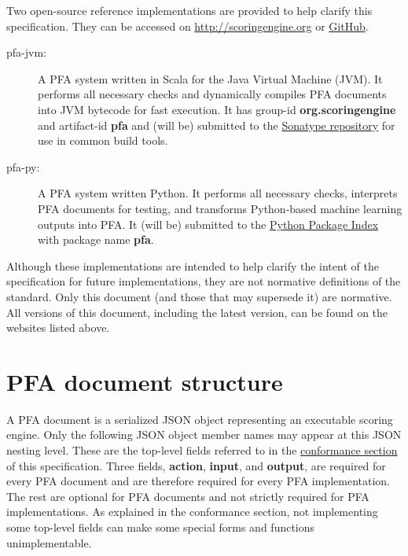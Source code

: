 \documentclass{article}
\newcommand{\PFAc}{\ttfamily\bfseries}
\theoremstyle{definition}
\begin{document}
Two open-source reference implementations are provided to help clarify this specification.  They can be accessed on \url{http://scoringengine.org} or \href{https://github.com/scoringengine/pfa}{GitHub}.
\begin{description}
\item[pfa-jvm:] A PFA system written in Scala for the Java Virtual Machine (JVM).  It performs all necessary checks and dynamically compiles PFA documents into JVM bytecode for fast execution.  It has group-id {\PFAc org.scoringengine} and artifact-id {\PFAc pfa} and (will be) submitted to the \href{http://search.maven.org/}{Sonatype repository} for use in common build tools.
\item[pfa-py:] A PFA system written Python.  It performs all necessary checks, interprets PFA documents for testing, and transforms Python-based machine learning outputs into PFA.  It (will be) submitted to the \href{https://pypi.python.org/pypi}{Python Package Index} with package name {\PFAc pfa}.
\end{description}

Although these implementations are intended to help clarify the intent of the specification for future implementations, they are not normative definitions of the standard.  Only this document (and those that may supersede it) are normative.  All versions of this document, including the latest version, can be found on the websites listed above.

\pagebreak

\section{PFA document structure}

A PFA document is a serialized JSON object representing an executable scoring engine.  Only the following JSON object member names may appear at this JSON nesting level.  These are the top-level fields referred to in the \hyperlink{hsec:conformance}{conformance section} of this specification.  Three fields, {\PFAc action}, {\PFAc input}, and {\PFAc output}, are required for every PFA document and are therefore required for every PFA implementation.  The rest are optional for PFA documents and not strictly required for PFA implementations.  As explained in the conformance section, not implementing some top-level fields can make some special forms and functions unimplementable.
\end{document}
